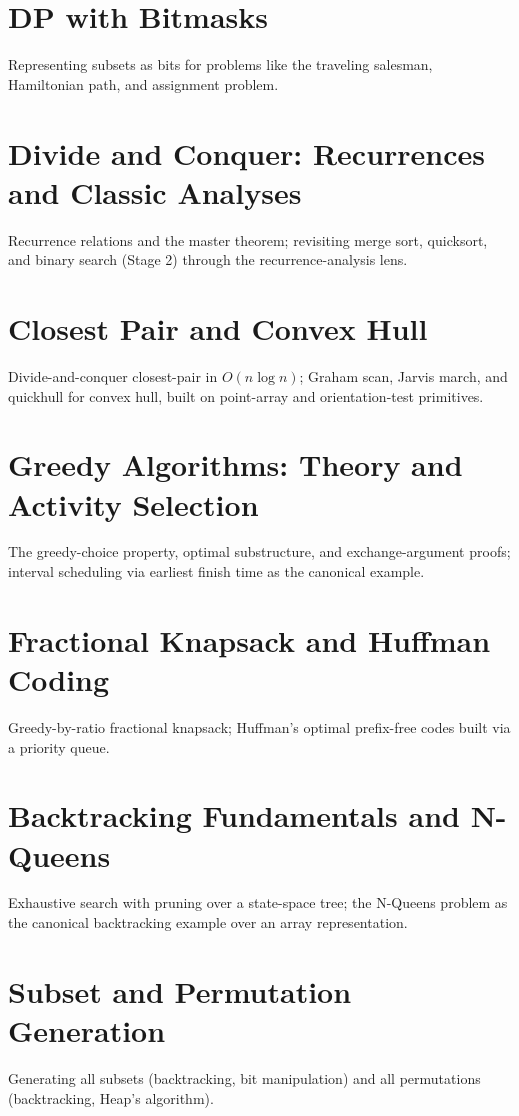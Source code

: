 \chapter{DP with Bitmasks}
Representing subsets as bits for problems like the traveling salesman, Hamiltonian path, and assignment problem.

\chapter{Divide and Conquer: Recurrences and Classic Analyses}
Recurrence relations and the master theorem; revisiting merge sort, quicksort, and binary search (Stage 2) through the recurrence-analysis lens.

\chapter{Closest Pair and Convex Hull}
Divide-and-conquer closest-pair in $O(n \log n)$; Graham scan, Jarvis march, and quickhull for convex hull, built on point-array and orientation-test primitives.

\chapter{Greedy Algorithms: Theory and Activity Selection}
The greedy-choice property, optimal substructure, and exchange-argument proofs; interval scheduling via earliest finish time as the canonical example.

\chapter{Fractional Knapsack and Huffman Coding}
Greedy-by-ratio fractional knapsack; Huffman's optimal prefix-free codes built via a priority queue.

\chapter{Backtracking Fundamentals and N-Queens}
Exhaustive search with pruning over a state-space tree; the N-Queens problem as the canonical backtracking example over an array representation.

\chapter{Subset and Permutation Generation}
Generating all subsets (backtracking, bit manipulation) and all permutations (backtracking, Heap's algorithm).

